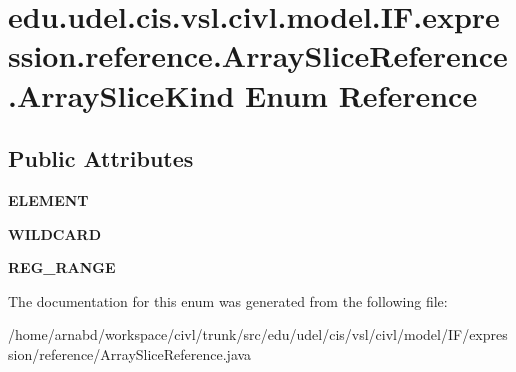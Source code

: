 \hypertarget{enumedu_1_1udel_1_1cis_1_1vsl_1_1civl_1_1model_1_1IF_1_1expression_1_1reference_1_1ArraySliceReference_1_1ArraySliceKind}{}\section{edu.\+udel.\+cis.\+vsl.\+civl.\+model.\+I\+F.\+expression.\+reference.\+Array\+Slice\+Reference.\+Array\+Slice\+Kind Enum Reference}
\label{enumedu_1_1udel_1_1cis_1_1vsl_1_1civl_1_1model_1_1IF_1_1expression_1_1reference_1_1ArraySliceReference_1_1ArraySliceKind}
\subsection*{Public Attributes}
\begin{DoxyCompactItemize}
\item 
\hypertarget{enumedu_1_1udel_1_1cis_1_1vsl_1_1civl_1_1model_1_1IF_1_1expression_1_1reference_1_1ArraySliceReference_1_1ArraySliceKind_a69c7f14b44c34da013059a410b93d8a1}{}{\bfseries E\+L\+E\+M\+E\+N\+T}\label{enumedu_1_1udel_1_1cis_1_1vsl_1_1civl_1_1model_1_1IF_1_1expression_1_1reference_1_1ArraySliceReference_1_1ArraySliceKind_a69c7f14b44c34da013059a410b93d8a1}

\item 
\hypertarget{enumedu_1_1udel_1_1cis_1_1vsl_1_1civl_1_1model_1_1IF_1_1expression_1_1reference_1_1ArraySliceReference_1_1ArraySliceKind_acb450d57e7e34bf2d1e0cd9515b6d340}{}{\bfseries W\+I\+L\+D\+C\+A\+R\+D}\label{enumedu_1_1udel_1_1cis_1_1vsl_1_1civl_1_1model_1_1IF_1_1expression_1_1reference_1_1ArraySliceReference_1_1ArraySliceKind_acb450d57e7e34bf2d1e0cd9515b6d340}

\item 
\hypertarget{enumedu_1_1udel_1_1cis_1_1vsl_1_1civl_1_1model_1_1IF_1_1expression_1_1reference_1_1ArraySliceReference_1_1ArraySliceKind_a1aa92d21161aa1b2fd1360196864745f}{}{\bfseries R\+E\+G\+\_\+\+R\+A\+N\+G\+E}\label{enumedu_1_1udel_1_1cis_1_1vsl_1_1civl_1_1model_1_1IF_1_1expression_1_1reference_1_1ArraySliceReference_1_1ArraySliceKind_a1aa92d21161aa1b2fd1360196864745f}

\end{DoxyCompactItemize}


The documentation for this enum was generated from the following file\+:\begin{DoxyCompactItemize}
\item 
/home/arnabd/workspace/civl/trunk/src/edu/udel/cis/vsl/civl/model/\+I\+F/expression/reference/Array\+Slice\+Reference.\+java\end{DoxyCompactItemize}
